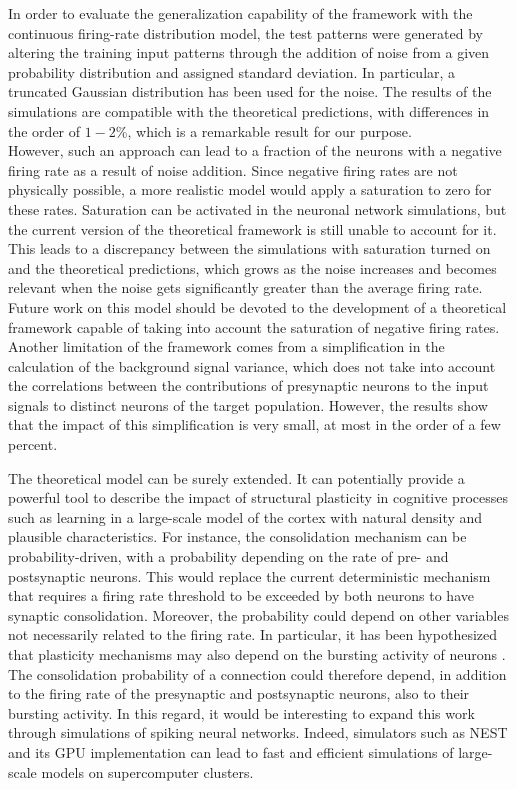 \documentclass[a4paper, 12pt, twoside, openright]{book}
\begin{document}
In order to evaluate the generalization capability of the framework with the continuous firing-rate distribution model, the test patterns were generated by altering the training input patterns through the addition of noise from a given probability distribution and assigned standard deviation. In particular, a truncated Gaussian distribution has been used for the noise.
The results of the simulations are compatible with the theoretical predictions, with differences in the order of $1-2$\%, which is a remarkable result for our purpose.\\
However, such an approach can lead to a fraction of the neurons with a negative firing rate as a result of noise addition. Since negative firing rates are not physically possible, a more realistic model would apply a saturation to zero for these rates. Saturation can be activated in the neuronal network simulations, but the current version of the theoretical framework is still unable to account for it. This leads to a discrepancy between the simulations with saturation turned on and the theoretical predictions, which grows as the noise increases and becomes relevant when the noise gets significantly greater than the average firing rate.
Future work on this model should be devoted to the development of a theoretical framework capable of taking into account the saturation of negative firing rates.\\
Another limitation of the framework comes from a simplification in the calculation of the background signal variance, which does not take into account the correlations between the contributions of presynaptic neurons to the input signals to distinct neurons of the target population.
However, the results show that the impact of this simplification is very small, at most in the order of a few percent.


The theoretical model can be surely extended. It can potentially provide a powerful tool to describe the impact of structural plasticity in cognitive processes such as learning in a large-scale model of the cortex with natural density and plausible characteristics. For instance, the consolidation mechanism can be probability-driven, with a probability depending on the rate of pre- and postsynaptic neurons. This would replace the current deterministic mechanism that requires a firing rate threshold to be exceeded by both neurons to have synaptic consolidation. Moreover, the probability could depend on other variables not necessarily related to the firing rate.
In particular, it has been hypothesized that plasticity mechanisms may also depend on the bursting activity of neurons \cite{Butts2007, Payeur2021}.
The consolidation probability of a connection could therefore depend, in addition to the firing rate of the presynaptic and postsynaptic neurons, also to their bursting activity. In this regard, it would be interesting to expand this work through simulations of spiking neural networks. Indeed, simulators such as NEST \cite{NEST} and its GPU implementation \cite{Tiddia2022, Golosio2023} can lead to fast and efficient simulations of large-scale models on supercomputer clusters.
\end{document}
